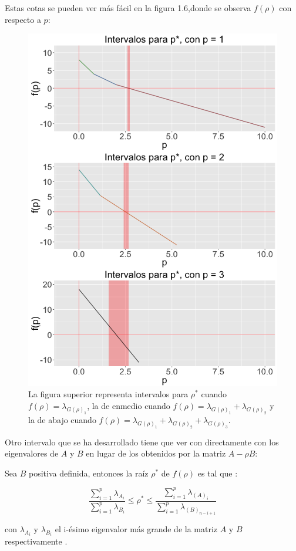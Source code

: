 \begin{example}
 Estas cotas se pueden ver más fácil en la figura 1.6,donde se observa $f(\rho)$ con respecto a $p$:

\begin{figure}[!ht] \label{Fig1.6}
  \centering
  \includegraphics[width=.9\textwidth]{Figures/Chapter2_grid3eigen_interv}  
  \caption[Intervalos para $\rho^*$. (Primera cota)] {La figura superior representa intervalos para $\rho^*$ cuando $f(\rho) = \lambda_{G(\rho)_1}$, la de enmedio cuando $f(\rho) = \lambda_{G(\rho)_1} + \lambda_{G(\rho)_2}$ y la de abajo cuando $f(\rho) = \lambda_{G(\rho)_1} + \lambda_{G(\rho)_2} + \lambda_{G(\rho)_3}$.}
\end{figure}

\end{example}

Otro intervalo que se ha desarrollado tiene que ver con directamente con los eigenvalores de $A$ y $B$ en lugar de los obtenidos por la matriz $A-\rho B$:

\pagebreak
\begin{proposition}
Sea $B$ positiva definida, entonces la raíz $\rho^*$ de $f(\rho)$ es tal que \cite{ngo2012trace}:

\begin{equation*}
\frac{\sum_{i = 1}^{p}\lambda_{A_i}}{\sum_{i = 1}^{p}\lambda_{B_i}} \leq \rho^* \leq \frac{\sum_{i = 1}^{p}\lambda_{(A)_i}}{\sum_{i = 1}^{p}\lambda_{(B)_{n-i+1}}}	
\end{equation*}

con $\lambda_{A_i}$ y $\lambda_{B_i}$ el i-ésimo eigenvalor más grande  de la matriz $A$ y $B$ respectivamente \cite{ngo2012trace}. 
\end{proposition}


